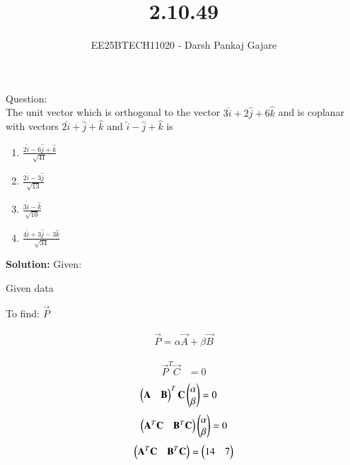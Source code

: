 \documentclass[journal,12pt,onecolumn]{IEEEtran}
\begin{document}
\title{2.10.49}
\author{EE25BTECH11020 - Darsh Pankaj Gajare}
{\let\newpage\relax\maketitle}
Question:\\
The unit vector which is orthogonal to the vector $3\hat{i}+2\hat{j} +6\hat{k}$ and is coplanar with vectors $2\hat{i}+\hat{j}+\hat{k}$ and $\hat{i}-\hat{j}+\hat{k}$ is
\begin{multicols}{4}
\begin{enumerate}
\item$\frac{2\hat{i}-6\hat{j}+\hat{k}}{\sqrt{41}}$
\item $\frac{2\hat{i}-3\hat{j}}{\sqrt{13}}$
\item $\frac{3\hat{i}-\hat{k}}{\sqrt{10}}$
\item $\frac{4\hat{i}+3\hat{j}-3\hat{k}}{\sqrt{34}}$
\end{enumerate}
\end{multicols}
\textbf{Solution:}
Given:
\begin{table}[H]
	\centering
	\label{}
	\caption{Given data}
	
\end{table}
To find: $\vec{P}$
\solution

\begin{align}
\vec{P} = \alpha\vec{A} + \beta\vec{B} 
\end{align}

\begin{align}
\vec{P}^T \vec{C} &= 0 
\end{align}
\begin{align}
    \begin{pmatrix}\mathbf{A} & \mathbf{B}\end{pmatrix}^T \mathbf{C} \begin{pmatrix}\alpha\\\beta\end{pmatrix} &= 0
\end{align}
\begin{align}
\begin{pmatrix}\mathbf{A}^T \mathbf{C} & \mathbf{B}^T \mathbf{C}\end{pmatrix}\begin{pmatrix}\alpha\\\beta\end{pmatrix} = 0
\end{align}
\begin{align}
 \begin{pmatrix}\mathbf{A}^T \mathbf{C} & \mathbf{B}^T \mathbf{C}\end{pmatrix} = \begin{pmatrix}14 & 7\end{pmatrix}
\end{align}
\end{document}
